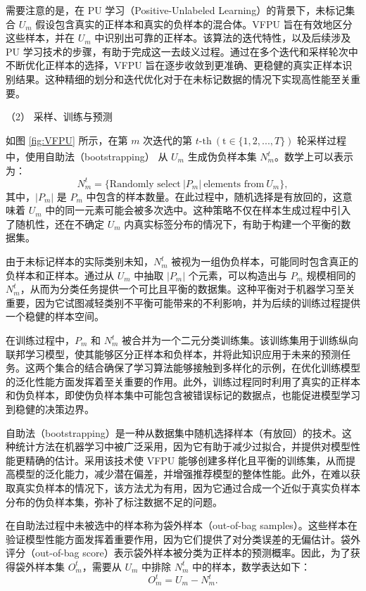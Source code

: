 需要注意的是，在 PU 学习（Positive-Unlabeled Learning）的背景下，未标记集合 ${{U}_{m}}$ 假设包含真实的正样本和真实的负样本的混合体。VFPU 旨在有效地区分这些样本，并在 ${{U}_{m}}$ 中识别出可靠的正样本。该算法的迭代特性，以及后续涉及 PU 学习技术的步骤，有助于完成这一去歧义过程。通过在多个迭代和采样轮次中不断优化正样本的选择，VFPU 旨在逐步收敛到更准确、更稳健的真实正样本识别结果。这种精细的划分和迭代优化对于在未标记数据的情况下实现高性能至关重要。

（2） 采样、训练与预测

如图 \ref{fig:VFPU} 所示，在第 $m$ 次迭代的第 $t\text{-th} \ (\text{t}\in \{1,2,...,T\})$ 轮采样过程中，使用自助法（bootstrapping）\textsuperscript{\cite{mordelet2014bagging}} 从 $U_{m}$ 生成伪负样本集 $N_{m}^{t}$。数学上可以表示为：
\begin{equation}
	N_{m}^{t}=\{ \text{Randomly select} \ |P_{m}| \ \text{elements from} \ U_{m} \},
\end{equation}
其中，$|P_{m}|$ 是 $P_{m}$ 中包含的样本数量。在此过程中，随机选择是有放回的，这意味着 $U_{m}$ 中的同一元素可能会被多次选中。这种策略不仅在样本生成过程中引入了随机性，还在不确定 $U_{m}$ 内真实标签分布的情况下，有助于构建一个平衡的数据集。

由于未标记样本的实际类别未知，$N_{m}^{t}$ 被视为一组伪负样本，可能同时包含真正的负样本和正样本。通过从 $U_{m}$ 中抽取 $|P_{m}|$ 个元素，可以构造出与 $P_{m}$ 规模相同的 $N_{m}^{t}$，从而为分类任务提供一个可比且平衡的数据集。这种平衡对于机器学习至关重要，因为它试图减轻类别不平衡可能带来的不利影响，并为后续的训练过程提供一个稳健的样本空间。

在训练过程中，$P_{m}$ 和 $N_{m}^{t}$ 被合并为一个二元分类训练集。该训练集用于训练纵向联邦学习模型，使其能够区分正样本和负样本，并将此知识应用于未来的预测任务。这两个集合的结合确保了学习算法能够接触到多样化的示例，在优化训练模型的泛化性能方面发挥着至关重要的作用。此外，训练过程同时利用了真实的正样本和伪负样本，即使伪负样本集中可能包含被错误标记的数据点，也能促进模型学习到稳健的决策边界。

自助法（bootstrapping）是一种从数据集中随机选择样本（有放回）的技术。这种统计方法在机器学习中被广泛采用，因为它有助于减少过拟合，并提供对模型性能更精确的估计。采用该技术使 VFPU 能够创建多样化且平衡的训练集，从而提高模型的泛化能力，减少潜在偏差，并增强推荐模型的整体性能。此外，在难以获取真实负样本的情况下，该方法尤为有用，因为它通过合成一个近似于真实负样本分布的伪负样本集，弥补了标注数据不足的问题。

在自助法过程中未被选中的样本称为袋外样本（out-of-bag samples）。这些样本在验证模型性能方面发挥着重要作用，因为它们提供了对分类误差的无偏估计。袋外评分（out-of-bag score）表示袋外样本被分类为正样本的预测概率。因此，为了获得袋外样本集 $O_{m}^{t}$，需要从 $U_{m}$ 中排除 $N_{m}^{t}$ 中的样本，数学表达如下：
\begin{equation}
	O_{m}^{t}=U_{m}-N_{m}^{t}.
\end{equation}

